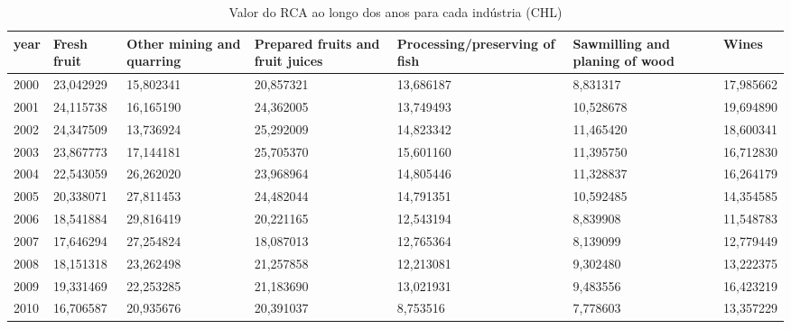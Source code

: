 \begin{table}
\centering
\caption{Valor do RCA ao longo dos anos para cada indústria (CHL)}
\begin{tabular}{p{1cm}p{2cm}p{2cm}p{2cm}p{2cm}p{2cm}p{2cm}}
\toprule
 year &  Fresh fruit &  Other mining and quarring &  Prepared fruits and fruit juices &  Processing/preserving of fish &  Sawmilling and planing of wood &     Wines \\
\midrule
 2000 &    23,042929 &                  15,802341 &                         20,857321 &                      13,686187 &                        8,831317 & 17,985662 \\
 2001 &    24,115738 &                  16,165190 &                         24,362005 &                      13,749493 &                       10,528678 & 19,694890 \\
 2002 &    24,347509 &                  13,736924 &                         25,292009 &                      14,823342 &                       11,465420 & 18,600341 \\
 2003 &    23,867773 &                  17,144181 &                         25,705370 &                      15,601160 &                       11,395750 & 16,712830 \\
 2004 &    22,543059 &                  26,262020 &                         23,968964 &                      14,805446 &                       11,328837 & 16,264179 \\
 2005 &    20,338071 &                  27,811453 &                         24,482044 &                      14,791351 &                       10,592485 & 14,354585 \\
 2006 &    18,541884 &                  29,816419 &                         20,221165 &                      12,543194 &                        8,839908 & 11,548783 \\
 2007 &    17,646294 &                  27,254824 &                         18,087013 &                      12,765364 &                        8,139099 & 12,779449 \\
 2008 &    18,151318 &                  23,262498 &                         21,257858 &                      12,213081 &                        9,302480 & 13,222375 \\
 2009 &    19,331469 &                  22,253285 &                         21,183690 &                      13,021931 &                        9,483556 & 16,423219 \\
 2010 &    16,706587 &                  20,935676 &                         20,391037 &                       8,753516 &                        7,778603 & 13,357229 \\

\end{tabular}
\end{table}
